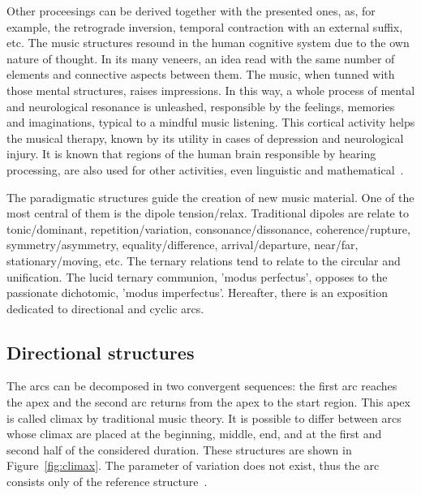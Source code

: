 \documentclass[
 aip,
 jmp,
 amsmath,amssymb,
 reprint,
]{revtex4-1}
\begin{document}
Other proceesings can be derived together with the presented ones, as, for example, the retrograde
inversion, temporal contraction with an external suffix, etc. The music
structures resound in the human cognitive system due to the own nature of
thought. In its many veneers, an idea read with the same number of elements and
connective aspects between them. The music, when tunned with those mental structures,
raises impressions. In this way, a whole process of mental and neurological
resonance is unleashed, responsible by the feelings, memories and imaginations,
typical to a mindful music listening. This cortical activity helps the
musical therapy, known by its utility in cases of depression and neurological
injury. It is known that regions of the human brain responsible by
hearing processing, are also used for other activities, even linguistic and mathematical~\cite{Sacks,Roederer}.

The paradigmatic structures guide the creation of new music material. One of the
most central of them is the dipole tension/relax. Traditional dipoles
are relate to tonic/dominant, repetition/variation,
consonance/dissonance, coherence/rupture, symmetry/asymmetry,
equality/difference, arrival/departure, near/far, stationary/moving,
etc. The ternary relations tend to relate to the circular and unification. The
lucid ternary communion, 'modus perfectus', opposes to the passionate
dichotomic, 'modus imperfectus'. Hereafter, there is an exposition dedicated to
directional and cyclic arcs.



\subsection{Directional structures}\label{subsec:dir}

The arcs can be decomposed in two convergent sequences: the first arc reaches the
apex and the second arc returns from the apex to the start region. This apex is called climax by traditional music theory. It is
possible to differ between arcs whose climax are placed at the beginning, middle, end,
and at the first and second half of the considered duration. These structures are
shown in Figure~\ref{fig:climax}. The parameter of variation does not exist, thus
the arc consists only of the reference structure~\cite{Schoenberg}.
\end{document}
